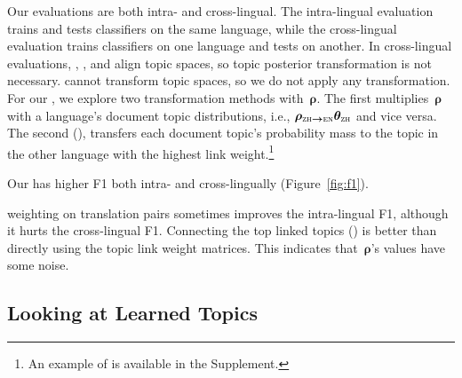 Our evaluations are both intra- and cross-lingual. The intra-lingual
evaluation trains and tests classifiers on the same
language, while the cross-lingual evaluation trains
classifiers on one language and tests on another. In cross-lingual
evaluations, \mtanchor, \mcta, and \ptlda align topic spaces, so topic
posterior transformation is not necessary. \lda cannot transform topic
spaces, so we do not apply any transformation. For our \mtm, we
explore two transformation methods with~$\bm{\rho}$. The first
multiplies~$\bm{\rho}$ with a language's document topic distributions,
i.e.,
$\bm{\rho_{\text{\textsc{zh}}\rightarrow \text{\textsc{en}}}}
\bm{\theta_{\text{\textsc{zh}}}}$ and vice versa. The second (\toplink),
transfers each document topic's probability mass to the topic in the
other language with the highest link weight.\footnote{An example of \toplink is available in the Supplement.}

Our \mtm has higher F1 both intra- and cross-lingually
(Figure~\ref{fig:f1}). \tfidf weighting
on translation pairs sometimes improves the intra-lingual F1,
although it hurts the cross-lingual F1. Connecting the top
linked topics (\toplink) is better than directly using the topic link
weight matrices. This indicates that~$\bm{\rho}$'s values have
some noise.


\subsection{Looking at Learned Topics}
\label{subsec:exp_example}


